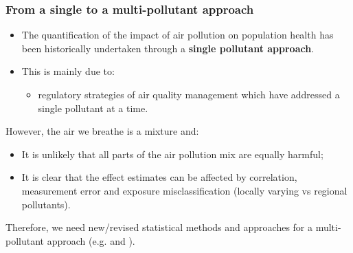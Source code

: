 \documentclass[slidestop,compress,serif,10pt]{beamer}
\begin{document}
\begin{frame}
\frametitle{From a single to a multi-pollutant approach}
\begin{itemize}
\item The quantification of the impact of air pollution on population health has been historically undertaken through a \textbf{single pollutant approach}. \vspace{-1pt}
\item This is mainly due to:
\begin{itemize}
\item regulatory strategies of air quality management which have addressed a single pollutant at a time. \vspace{-1pt}
 \end{itemize}
 \end{itemize}
 \vspace{3pt}
\pause \alert{However}, the air we breathe is a mixture and:
\begin{itemize}
 \item It is unlikely that all parts of the air pollution mix are equally harmful;\vspace{-1pt}
 \item It is clear that the effect estimates can be affected by correlation, measurement error and exposure misclassification (locally varying vs regional pollutants).
\end{itemize}
 \vspace{3pt}
Therefore, we need new/revised statistical methods and approaches for a \alert{multi-pollutant approach} (e.g. \citealt{cull2015} and \citealt{molitor2016}).
\end{frame}
\end{document}

